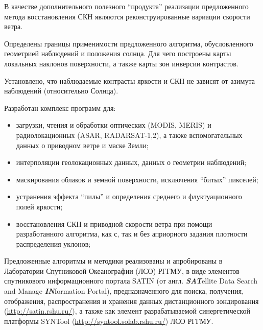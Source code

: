 В качестве дополнительного полезного ``продукта'' реализации предложенного метода восстановления СКН являются реконструированные вариации скорости ветра.

Определены границы применимости предложенного алгоритма, обусловленного геометрией наблюдений и положения солнца. Для чего построены карты локальных наклонов поверхности, а также карты зон инверсии контрастов.

Установлено, что наблюдаемые контрасты яркости и СКН не зависят от азимута наблюдений (относительно Солнца).

Разработан комплекс программ для:
\begin{itemize}
\item загрузки, чтения и обработки оптических (MODIS, MERIS) и радиолокационных (ASAR, RADARSAT-1,2), а также вспомогательных данных о приводном ветре и маске Земли;
\item интерполяции геолокационных данных, данных о геометрии наблюдений;
\item маскирования облаков и земной поверхности, исключения ``битых'' пикселей;
\item устранения эффекта ``пилы'' и определения среднего и флуктуационного полей яркости;
\item восстановления СКН и приводной скорости ветра при помощи разработанного алгоритма, как с, так и без априорного задания плотности распределения уклонов;
\end{itemize}

Предложенные алгоритмы и методики реализованы и апробированы в Лаборатории Спутниковой Океанографии (ЛСО) РГГМУ, в виде элементов спутникового информационного портала SATIN (от англ. \textit{\textbf{SAT}}ellite Data Search and Manage \textit{\textbf{IN}}formation Portal), предназначенного для поиска, получения, отображения, распространения и хранения данных дистанционного зондирования (\url{http://satin.rshu.ru/}), а также как элемент разрабатываемой синергетической платформы SYNTool (\url{http://syntool.solab.rshu.ru/}) ЛСО РГГМУ.



\clearpage
